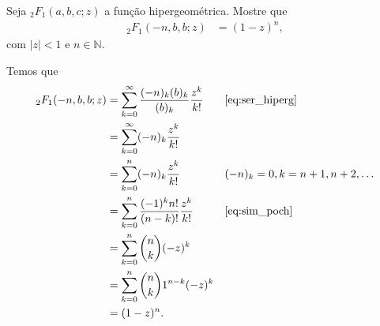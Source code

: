 \documentclass[a4paper,10pt, leqno, answers]{exam}  %
\begin{document}
\begin{questions}
    \question[P2 de 2006] Seja ${}_2F_1(a, b, c; z)$ a fun\c{c}\~{a}o hipergeom\'{e}trica. Mostre que
    \begin{align*}
        {}_2F_1(-n, b, b; z) &= (1 - z)^n,
    \end{align*}
    com $|z| < 1$ e $n \in \mathbb{N}$.
    \begin{solution}
        Temos que
        \begin{align*}
            {}_2F_1(-n, b, b; z) &= \sum_{k = 0}^\infty \frac{(-n)_k (b)_k}{(b)_k} \frac{z^k}{k!} && \text{\eqref{eq:ser_hiperg}} \\
            &= \sum_{k = 0}^\infty (-n)_k \frac{z^k}{k!} \\
            &= \sum_{k = 0}^n (-n)_k \frac{z^k}{k!} && (-n)_k = 0, k = n + 1, n + 2, \ldots \\
            &= \sum_{k = 0}^n \frac{(-1)^k n!}{(n - k)!} \frac{z^k}{k!} && \text{\eqref{eq:sim_poch}} \\
            &= \sum_{k = 0}^n \binom{n}{k} (-z)^k \\
            &= \sum_{k = 0}^n \binom{n}{k} 1^{n - k} (-z)^k \\
            &= (1 - z)^n.
        \end{align*}
    \end{solution}


\end{questions}
\end{document}
